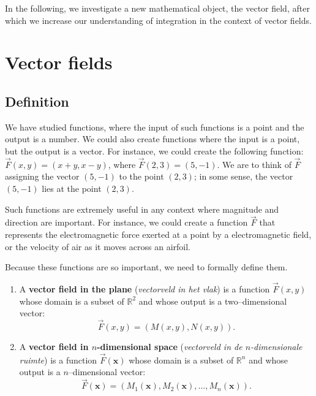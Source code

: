 In the following, we investigate a new mathematical object, the vector field, after which we increase our understanding of integration in the context of vector fields.

\section{Vector fields}\label{sec:vector_fields}
\subsection{Definition}
	\checkoddpage
{}
We have studied functions, where the input of such functions is a point and the output is a number. We could also create functions where the input is a point, but the output is a  vector. For instance, we could create the following function: $\vec F(x,y) = \left( x+y, x-y\right)$, where $\vec F(2,3) = \left( 5,-1\right)$. We are to think of $\vec F$ assigning the vector $\left( 5,-1\right)$ to the point $(2,3)$; in some sense, the vector $\left( 5,-1\right)$ lies at the point $(2,3)$. 

Such functions are extremely useful in any context where magnitude and direction are important. For instance, we could create a function $\vec F$ that represents the electromagnetic force exerted at a point by a electromagnetic field, or the velocity of air as it moves across an airfoil. 

Because these functions are so important, we need to formally define them.

\begin{definition}\label{def:vector_field}
\begin{enumerate}
	\item A \textbf{vector field in the plane} (\textit{vectorveld in het vlak}) is a function $\vec F(x,y)$ whose domain is a subset of $\mathbb{R}^2$ and whose output is a two--dimensional vector:
	$$\vec F(x,y) = \left( M(x,y), N(x,y)\right).$$
	
	\item A \textbf{vector field in $n$-dimensional space} (\textit{vectorveld in de $n$-dimensionale ruimte}) is a function $\vec F(\mathbf{x})$ whose domain is a subset of $\mathbb{R}^n$ and whose output is a $n$--dimensional vector:
	$$\vec F(\mathbf{x}) = \left( M_1(\mathbf{x}), M_2(\mathbf{x}),\ldots, M_n(\mathbf{x})\right).$$
\end{enumerate}
\end{definition}

